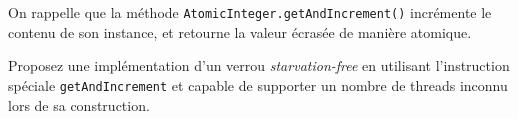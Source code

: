 
\begingroup

\begin{exercice}
  \label{exo:locks/getAndIncrement}

  On rappelle que la méthode \lstinline{AtomicInteger.getAndIncrement()} incrémente le contenu de son instance, et retourne la valeur écrasée de manière atomique. 

  \begin{questions}
  \item Proposez une implémentation d'un verrou \emph{starvation-free} en utilisant l'instruction spéciale \lstinline{getAndIncrement}
    et capable de supporter un nombre de threads inconnu lors de sa construction.
  \end{questions}

\end{exercice}

\endgroup
\endinput
